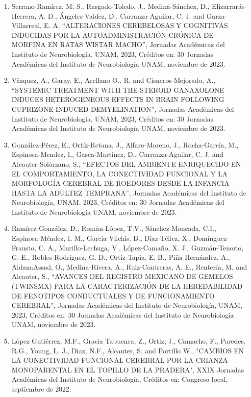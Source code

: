 \documentclass[12pt]{article}
\begin{document}
\begin{enumerate}
\item Serrano-Ramírez, M. S., Rasgado-Toledo, J., Medina-Sánchez, D., Elizarrarás-Herrera, A. D., Ángeles-Valdez, D., Carranza-Aguilar, 
C. J. and Garza-Villarreal, E. A, “ALTERACIONES CEREBELOSAS Y COGNITIVAS INDUCIDAS POR LA AUTOADMINISTRACIÓN CRÓNICA DE MORFINA EN 
RATAS WISTAR MACHO”, Jornadas Académicas del Instituto de Neurobiología, UNAM, 2023, Créditos en: 30 Jornadas Académicas del Instituto 
de Neurobiología UNAM, noviembre de 2023.

\item Vázquez, A., Garay, E., Arellano O., R. and Cisneros-Mejorado, A., “SYSTEMIC TREATMENT WITH THE STEROID GANAXOLONE 
INDUCES HETEROGENEOUS EFFECTS IN BRAIN FOLLOWING CUPRIZONE INDUCED DEMYELINATION”, Jornadas Académicas del Instituto de Neurobiología, 
UNAM, 2023, Créditos en: 30 Jornadas Académicas del Instituto de Neurobiología UNAM, noviembre de 2023.

\item González-Pérez, E., Ortíz-Retana, J., Alfaro-Moreno, J., Rocha-García, M., Espinosa-Mendez, I., Gasca-Martinez, D., 
Carranza-Aguilar, C. J. and Alcauter-Solórzano, S., “EFECTOS DEL AMBIENTE ENRIQUECIDO EN EL COMPORTAMIENTO, LA CONECTIVIDAD FUNCIONAL Y 
LA MORFOLOGÍA CEREBRAL DE ROEDORES DESDE LA INFANCIA HASTA LA ADULTEZ TEMPRANA”, Jornadas Académicas del Instituto de Neurobiología, 
UNAM, 2023, Créditos en: 30 Jornadas Académicas del Instituto de Neurobiología UNAM, noviembre de 2023.

\item Ramírez-González, D., Román-López, T.V., Sánchez-Moncada, C.I., Espinosa-Méndez, I. M., García-Vilchis, B., Díaz-Téllez, X., 
Domínguez-Frausto, C. A., Murillo-Lechuga, V., López-Camaño, X. J., Guzmán-Tenorio, G. E., Robles-Rodríguez, G. D., Ortiz-Tapia, E. B., 
Piña-Hernández, A., AldanaAssad, O., Medina-Rivera, A., Ruiz-Contreras, A. E., Rentería, M. and Alcauter, S., “AVANCES DEL REGISTRO 
MEXICANO DE GEMELOS (TWINSMX) PARA LA CARACTERIZACIÓN DE LA HEREDABILIDAD DE FENOTIPOS CONDUCTUALES Y DE FUNCIONAMIENTO CEREBRAL”, 
Jornadas Académicas del Instituto de Neurobiología, UNAM, 2023, Créditos en: 30 Jornadas Académicas del Instituto de Neurobiología 
UNAM, noviembre de 2023.

\item López Gutiérrez, M.F., Gracia Tabuenca, Z., Ortiz, J., Camacho, F., Paredes, R.G., Young, L. J., Diaz, N.F., Alcauter, S. and 
Portillo W., "CAMBIOS EN LA CONECTIVIDAD FUNCIONAL CEREBRAL POR LA CRIANZA MONOPARENTAL EN EL TOPILLO DE LA PRADERA", XXIX Jornadas 
Académicas del Instituto de Neurobiología, Créditos en: Congreso local, septiembre de 2022.


\end{enumerate}
\end{document}
